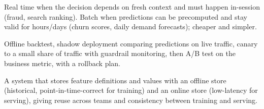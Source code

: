 \A Real time when the decision depends on fresh context and must happen in-session (fraud, search ranking). Batch when predictions can be precomputed and stay valid for hours/days (churn scores, daily demand forecasts); cheaper and simpler.

\A Offline backtest, shadow deployment comparing predictions on live traffic, canary to a small share of traffic with guardrail monitoring, then A/B test on the business metric, with a rollback plan.

\A A system that stores feature definitions and values with an offline store (historical, point-in-time-correct for training) and an online store (low-latency for serving), giving reuse across teams and consistency between training and serving.

